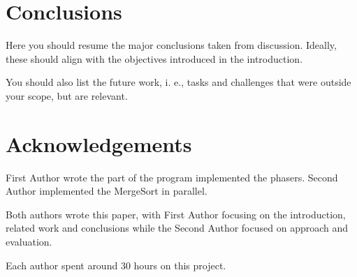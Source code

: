 \documentclass[runningheads]{llncs}
\begin{document}
\section{Conclusions}

Here you should resume the major conclusions taken from discussion. Ideally, these should align with the objectives introduced in the introduction.


You should also list the future work, i. e., tasks and challenges that were outside your scope, but are relevant.

\section*{Acknowledgements}

First Author wrote the part of the program implemented the phasers. Second Author implemented the MergeSort in parallel. 

Both authors wrote this paper, with First Author focusing on the introduction, related work and conclusions while the Second Author focused on approach and evaluation.

Each author spent around 30 hours on this project.



\end{document}

